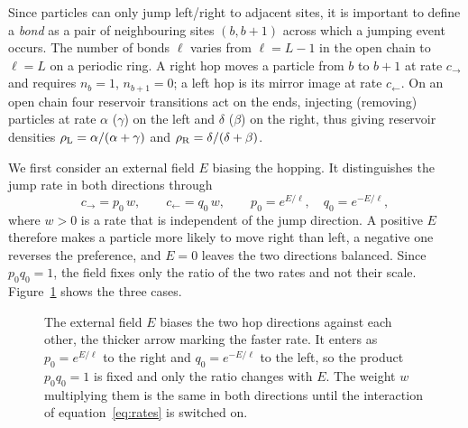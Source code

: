 \documentclass[11pt]{article}
\begin{document}
Since particles can only jump left/right to adjacent sites, it is important to define a \emph{bond} as a pair of neighbouring sites $(b, b+1)$ across which a jumping event occurs. The number of bonds $\ell$ varies from $\ell=L-1$ in the open chain to $\ell=L$ on a periodic ring. A right hop moves a particle from $b$ to $b+1$ at rate $c_\rightarrow$ and requires $n_b = 1$, $n_{b+1} = 0$; a left hop is its mirror image at rate $c_\leftarrow$. On an open chain four reservoir transitions act on the ends, injecting (removing) particles at rate $\alpha$ ($\gamma$) on the left and $\delta$ ($\beta$) on the right, thus giving reservoir densities $\rho_{\rm L} = \alpha/(\alpha + \gamma)$ and $\rho_{\rm R} = \delta/(\delta + \beta)$.

We first consider an external field $E$ biasing the hopping. It distinguishes the jump rate in both directions through
\begin{equation}
    c_\rightarrow = p_0 \, w, \qquad c_\leftarrow = q_0 \, w,
    \qquad p_0 = e^{E/\ell}, \quad q_0 = e^{-E/\ell},
    \label{eq:field}
\end{equation}
where $w > 0$ is a rate that is independent of the jump direction. A positive $E$ therefore makes a particle more likely to move right than left, a negative one reverses the preference, and $E = 0$ leaves the two directions balanced. Since $p_0 q_0 = 1$, the field fixes only the ratio of the two rates and not their scale. Figure~\ref{fig:field} shows the three cases. 
\begin{figure}[htbp]
\centering
{}
\caption{The external field $E$ biases the two hop directions against each
other, the thicker arrow marking the faster rate. It enters as
$p_0 = e^{E/\ell}$ to the right and $q_0 = e^{-E/\ell}$ to the left, so the
product $p_0 q_0 = 1$ is fixed and only the ratio changes with $E$. The
weight $w$ multiplying them is the same in both directions until the interaction
of equation~\ref{eq:rates} is switched on.}
\label{fig:field}
\end{figure}
\end{document}
